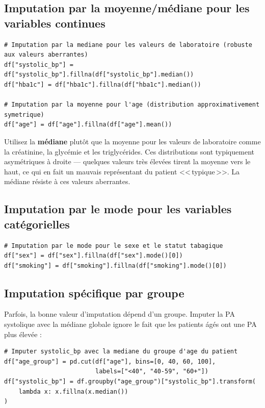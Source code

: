 \subsection{Imputation par la moyenne/m\'ediane pour les variables continues}

\begin{verbatim}
# Imputation par la mediane pour les valeurs de laboratoire (robuste aux valeurs aberrantes)
df["systolic_bp"] = df["systolic_bp"].fillna(df["systolic_bp"].median())
df["hba1c"] = df["hba1c"].fillna(df["hba1c"].median())

# Imputation par la moyenne pour l'age (distribution approximativement symetrique)
df["age"] = df["age"].fillna(df["age"].mean())
\end{verbatim}

\begin{clinicalnote}
Utilisez la \textbf{m\'ediane} plut\^ot que la moyenne pour les valeurs de laboratoire comme la cr\'eatinine, la glyc\'emie et les triglyc\'erides. Ces distributions sont typiquement asym\'etriques \`a droite --- quelques valeurs tr\`es \'elev\'ees tirent la moyenne vers le haut, ce qui en fait un mauvais repr\'esentant du patient <<\,typique\,>>. La m\'ediane r\'esiste \`a ces valeurs aberrantes.
\end{clinicalnote}

\subsection{Imputation par le mode pour les variables cat\'egorielles}

\begin{verbatim}
# Imputation par le mode pour le sexe et le statut tabagique
df["sex"] = df["sex"].fillna(df["sex"].mode()[0])
df["smoking"] = df["smoking"].fillna(df["smoking"].mode()[0])
\end{verbatim}

\subsection{Imputation sp\'ecifique par groupe}

Parfois, la bonne valeur d'imputation d\'epend d'un groupe. Imputer la PA systolique avec la m\'ediane globale ignore le fait que les patients \'ag\'es ont une PA plus \'elev\'ee :

\begin{verbatim}
# Imputer systolic_bp avec la mediane du groupe d'age du patient
df["age_group"] = pd.cut(df["age"], bins=[0, 40, 60, 100],
                         labels=["<40", "40-59", "60+"])
df["systolic_bp"] = df.groupby("age_group")["systolic_bp"].transform(
    lambda x: x.fillna(x.median())
)
\end{verbatim}

